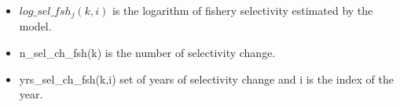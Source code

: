 \documentclass{article}
\begin{document}
\begin{itemize}
    \item $log\_sel\_fsh_j(k,i)$ is the logarithm of fishery selectivity estimated by the model. 
    \item n\_sel\_ch\_fsh(k) is the number of selectivity change.
    \item yrs\_sel\_ch\_fsh(k,i) set of years of selectivity change and i is the index of the year.
    

\end{itemize}
\end{document}
